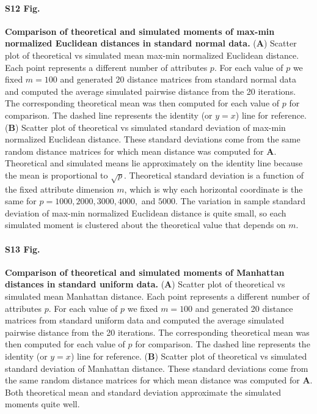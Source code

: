 \documentclass[10pt,letterpaper]{article}
\begin{document}
\paragraph*{S12 Fig.}
\label{S12_Fig}
{\bf Comparison of theoretical and simulated moments of max-min normalized Euclidean distances in standard normal data.} (\textbf{A}) Scatter plot of theoretical vs simulated mean max-min normalized Euclidean distance. Each point represents a different number of attributes $p$. For each value of $p$ we fixed $m=100$ and generated 20 distance matrices from standard normal data and computed the average simulated pairwise distance from the 20 iterations. The corresponding theoretical mean was then computed for each value of $p$ for comparison. The dashed line represents the identity (or $y=x$) line for reference. (\textbf{B}) Scatter plot of theoretical vs simulated standard deviation of max-min normalized Euclidean distance. These standard deviations come from the same random distance matrices for which mean distance was computed for \textbf{A}. Theoretical and simulated means lie approximately on the identity line because the mean is proportional to $\sqrt{p}$. Theoretical standard deviation is a function of the fixed attribute dimension $m$, which is why each horizontal coordinate is the same for $p=1000,2000,3000,4000,$ and $5000$. The variation in sample standard deviation of max-min normalized Euclidean distance is quite small, so each simulated moment is clustered about the theoretical value that depends on $m$.

\paragraph*{S13 Fig.}
\label{S13_Fig}
{\bf Comparison of theoretical and simulated moments of Manhattan distances in standard uniform data.} (\textbf{A}) Scatter plot of theoretical vs simulated mean Manhattan distance. Each point represents a different number of attributes $p$. For each value of $p$ we fixed $m=100$ and generated 20 distance matrices from standard uniform data and computed the average simulated pairwise distance from the 20 iterations. The corresponding theoretical mean was then computed for each value of $p$ for comparison. The dashed line represents the identity (or $y=x$) line for reference. (\textbf{B}) Scatter plot of theoretical vs simulated standard deviation of Manhattan distance. These standard deviations come from the same random distance matrices for which mean distance was computed for \textbf{A}. Both theoretical mean and standard deviation approximate the simulated moments quite well.
\end{document}
